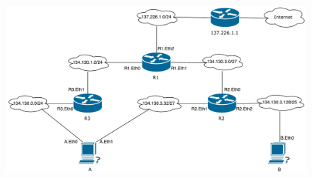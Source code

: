 \documentclass{../exercisesheet}
\begin{document}
\begin{exercise}{5}
\begin{subexercise}
\begin{figure}[H]
  \centering
  \includegraphics[width=\textwidth]{a3_network.pdf}
\end{figure}
\end{subexercise}
\begin{subexercise}
\end{subexercise}
\end{exercise}
\end{document}
